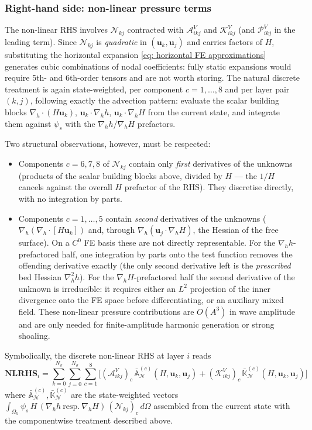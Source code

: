 \documentclass{article}
\newcommand{\Ns}{N_\sigma}
\newcommand{\uj}{\mathbf{u}_j}
\newcommand{\uk}{\mathbf{u}_k}
\newcommand{\sumj}{\sum_{j=0}^{\Ns}}
\newcommand{\sumk}{\sum_{k=0}^{\Ns}}
\newcommand{\nablah}{\nabla_h}
\newcommand{\VAikj}{\boldsymbol{\mathcal{A}}_{ikj}^V}
\newcommand{\VKikj}{\boldsymbol{\mathcal{K}}_{ikj}^V}
\newcommand{\VPikj}{\boldsymbol{\mathcal{P}}_{ikj}^V}
\begin{document}
\subsubsection*{Right-hand side: non-linear pressure terms}

The non-linear RHS involves $\mathcal{N}_{kj}$ contracted with $\VAikj$ and $\VKikj$ (and $\VPikj$ in the leading term). Since $\mathcal{N}_{kj}$ is \emph{quadratic} in $(\uk,\uj)$ and carries factors of $H$, substituting the horizontal expansion \eqref{eq: horizontal FE approximations} generates cubic combinations of nodal coefficients: fully static expansions would require 5th- and 6th-order tensors and are not worth storing. The natural discrete treatment is again state-weighted, per component $c = 1,\dots,8$ and per layer pair $(k,j)$, following exactly the advection pattern: evaluate the scalar building blocks $\nablah\cdot(H\uk)$, $\uk\cdot\nablah h$, $\uk\cdot\nablah H$ from the current state, and integrate them against $\psi_s$ with the $\nablah h$/$\nablah H$ prefactors.

Two structural observations, however, must be respected:
\begin{itemize}
    \item Components $c = 6,7,8$ of $\mathcal{N}_{kj}$ contain only \emph{first} derivatives of the unknowns (products of the scalar building blocks above, divided by $H$ — the $1/H$ cancels against the overall $H$ prefactor of the RHS). They discretise directly, with no integration by parts.
    \item Components $c = 1,\dots,5$ contain \emph{second} derivatives of the unknowns ($\nablah(\nablah\cdot[H\uk])$ and, through $\nablah(\uj\cdot\nablah H)$, the Hessian of the free surface). On a $C^0$ FE basis these are not directly representable. For the $\nablah h$-prefactored half, one integration by parts onto the test function removes the offending derivative exactly (the only second derivative left is the \emph{prescribed} bed Hessian $\nablah^2 h$). For the $\nablah H$-prefactored half the second derivative of the unknown is irreducible: it requires either an $L^2$ projection of the inner divergence onto the FE space before differentiating, or an auxiliary mixed field. These non-linear pressure contributions are $O(A^3)$ in wave amplitude and are only needed for finite-amplitude harmonic generation or strong shoaling.
\end{itemize}
Symbolically, the discrete non-linear RHS at layer $i$ reads
\begin{equation}
    \mathbf{NLRHS}_{i} = \sumk\sumj\sum_{c=1}^{8}\Big[(\VAikj)_c\,\bar{\mathbb{A}}^{(c)}_{\mathcal{N}}(H,\uk,\uj) + (\VKikj)_c\,\bar{\mathbb{K}}^{(c)}_{\mathcal{N}}(H,\uk,\uj)\Big]
    \label{eq: discrete nonlinear RHS}
\end{equation}
where $\bar{\mathbb{A}}^{(c)}_{\mathcal{N}},\bar{\mathbb{K}}^{(c)}_{\mathcal{N}}$ are the state-weighted vectors $\int_{\Omega_h}\psi_s\,H\,(\nablah h\ \text{resp.}\ \nablah H)\,(\mathcal{N}_{kj})_c\,d\Omega$ assembled from the current state with the componentwise treatment described above.
 
\end{document}
